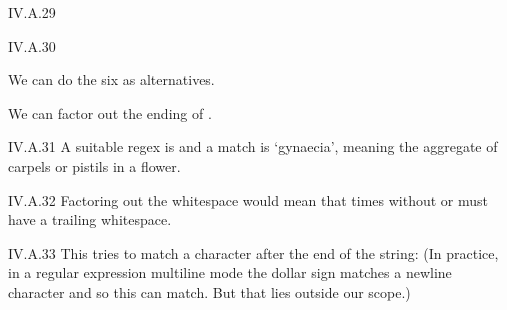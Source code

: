%
\begin{ans}{IV.A.29}
\begin{exparts}
\item {}
\item {}
\item {}
\end{exparts}
\end{ans}
%
\begin{ans}{IV.A.30}
\begin{exparts}
\item
We can do the six as alternatives.
\begin{center}
\end{center}
\item We can factor out the ending of .
\begin{center}
\end{center}
\end{exparts}
\end{ans}
%
\begin{ans}{IV.A.31}
\verified
A suitable regex is  and a match is
`gynaecia', meaning the aggregate of carpels or pistils in a flower.
\end{ans}
%
\begin{ans}{IV.A.32}
Factoring out the whitespace would mean that times without  or 
must have a trailing whitespace.
\end{ans}
%
\begin{ans}{IV.A.33}
This tries to match a character after the end of the string: 
(In practice, in a regular expression multiline mode the dollar sign matches a
newline character and so this can match.
But that lies outside our scope.)
\end{ans}
